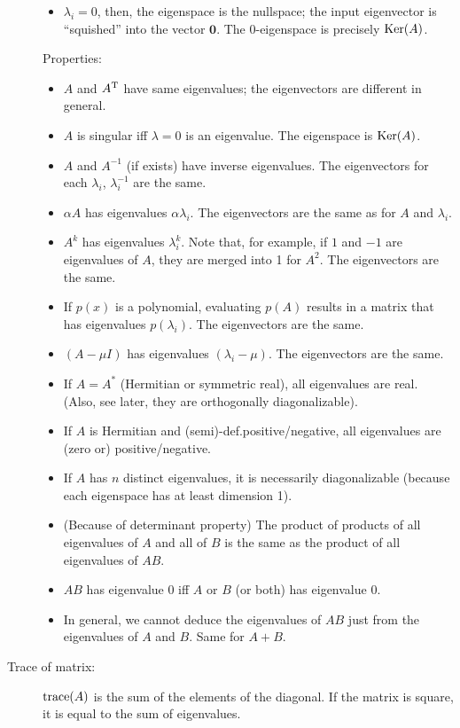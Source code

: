 \documentclass[
  12pt,
  paper=a4,
]{scrartcl} %
\begin{document}
\begin{description}
\begin{itemize}
    \item $\lambda_i=0$, then, the eigenspace is the nullspace; the input eigenvector is ``squished'' into the vector $\bm 0$. The $0$-eigenspace is precisely $\operatorname{Ker}(A)$.
\end{itemize}

Properties:
\begin{itemize}
    \item $A$ and $A^{\mathrm{T}}$ have same eigenvalues; the eigenvectors are different in general.
    \item $A$ is singular iff $\lambda=0$ is an eigenvalue. The eigenspace is $\operatorname{Ker}(A)$.
    \item $A$ and $A^{-1}$ (if exists) have inverse eigenvalues. The eigenvectors for each $\lambda_i$, $\lambda_i^{-1}$ are the same.
    \item $\alpha A$ has eigenvalues $\alpha\lambda_i$. The eigenvectors are the same as for $A$ and $\lambda_i$.
    \item $A^k$ has eigenvalues $\lambda_i^k$. Note that, for example, if $1$ and $-1$ are eigenvalues of $A$, they are merged into 1 for $A^2$. The eigenvectors are the same.
    \item If $p(x)$ is a polynomial, evaluating $p(A)$ results in a matrix that has eigenvalues $p(\lambda_i)$. The eigenvectors are the same.
    \item $(A-\mu I)$ has eigenvalues $(\lambda_i - \mu)$. The eigenvectors are the same.
    \item If $A=A^*$ (Hermitian or symmetric real), all eigenvalues are real. (Also, see later, they are orthogonally diagonalizable).
    \item If $A$ is Hermitian and (semi)-def.\@ positive/negative, all eigenvalues are (zero or) positive/negative.
    \item If $A$ has $n$ distinct eigenvalues, it is necessarily diagonalizable (because each eigenspace has at least dimension 1). 
    \item (Because of determinant property) The product of products of all eigenvalues of $A$ and all of $B$ is the same as the product of all eigenvalues of $AB$.
    \item $AB$ has eigenvalue $0$ iff $A$ or $B$ (or both) has eigenvalue $0$.
    \item In general, we cannot deduce the eigenvalues of $AB$ just from the eigenvalues of $A$ and $B$. Same for $A+B$.
\end{itemize}

\item[Trace of matrix:]{} $\operatorname{trace}(A)$ is the sum of the elements of the diagonal. If the matrix is square, it is equal to the sum of eigenvalues.


\end{description}
\end{document}
